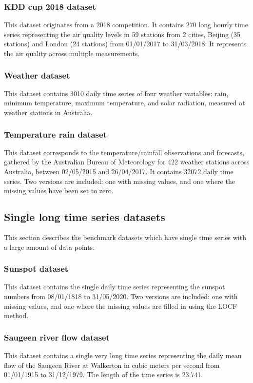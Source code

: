 \documentclass{article}
\begin{document}
\subsubsection{KDD cup 2018 dataset}
This dataset originates from a 2018 competition. It contains 270 long hourly time series representing  the air quality levels in 59 stations from 2 cities, Beijing (35 stations) and London (24 stations) from 01/01/2017 to 31/03/2018. It represents the air quality across multiple measurements.

\subsubsection{Weather dataset}
This dataset contains 3010 daily time series of four weather variables: rain, minimum temperature,
maximum temperature, and solar radiation, measured at weather stations in Australia.

\subsubsection{Temperature rain dataset}
This dataset corresponds to the temperature/rainfall observations and forecasts, gathered by the Australian Bureau of Meteorology for 422 weather stations across Australia, between 02/05/2015 and 26/04/2017. It contains 32072 daily time series. Two versions are included: one with missing values, and one where the missing values have been set to zero.

\subsection{Single long time series datasets}
This section describes the benchmark datasets which have single time series with a large amount of
data points.

\subsubsection{Sunspot dataset}
This dataset contains the single daily time series representing the sunspot numbers from 08/01/1818
to 31/05/2020. Two versions are included: one with missing values, and one where the missing values are filled in using the LOCF method.

\subsubsection{Saugeen river flow dataset}
This dataset contains a single very long time series representing the daily mean flow of the Saugeen
River at Walkerton in cubic meters per second from 01/01/1915 to 31/12/1979. The length of the time series is 23,741.
\end{document}

